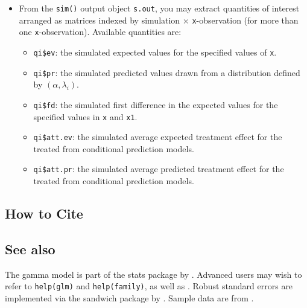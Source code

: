 \begin{itemize}
\item From the {\tt sim()} output object {\tt s.out}, you may extract
  quantities of interest arranged as matrices indexed by simulation
  $\times$ {\tt x}-observation (for more than one {\tt x}-observation).
  Available quantities are:

   \begin{itemize}
   \item {\tt qi\$ev}: the simulated expected values for the specified
     values of {\tt x}.
   \item {\tt qi\$pr}: the simulated predicted values drawn from a
     distribution defined by $(\alpha, \lambda_i)$.
   \item {\tt qi\$fd}: the simulated first difference in the expected
     values for the specified values in {\tt x} and {\tt x1}.
   \item {\tt qi\$att.ev}: the simulated average expected treatment
     effect for the treated from conditional prediction models.  
   \item {\tt qi\$att.pr}: the simulated average predicted treatment
     effect for the treated from conditional prediction models.  
   \end{itemize}
\end{itemize}


\subsection* {How to Cite} 





\subsection* {See also}
The gamma model is part of the stats package by \citet{VenRip02}.
Advanced users may wish to refer to \texttt{help(glm)} and
\texttt{help(family)}, as well as \cite{McCNel89}. Robust standard
errors are implemented via the sandwich package by \citet{Zeileis04}.
Sample data are from \cite{KinTomWit00}.



 











